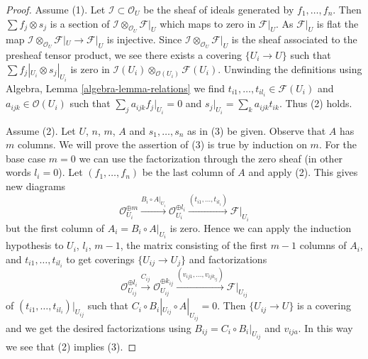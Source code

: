 \begin{proof}
Assume (1). Let $\mathcal{I} \subset \mathcal{O}_U$ be the sheaf of ideals
generated by $f_1, \ldots, f_n$. Then $\sum f_j \otimes s_j$ is
a section of $\mathcal{I} \otimes_{\mathcal{O}_U} \mathcal{F}|_U$
which maps to zero in $\mathcal{F}|_U$. As $\mathcal{F}|_U$ is flat
the map
$\mathcal{I} \otimes_{\mathcal{O}_U} \mathcal{F}|_U \to \mathcal{F}|_U$
is injective. Since $\mathcal{I} \otimes_{\mathcal{O}_U} \mathcal{F}|_U$
is the sheaf associated to the presheaf tensor product, we see
there exists a covering $\{U_i \to U\}$ such
that $\sum f_j|_{U_i} \otimes s_j|_{U_i}$ is zero in
$\mathcal{I}(U_i) \otimes_{\mathcal{O}(U_i)} \mathcal{F}(U_i)$.
Unwinding the definitions using Algebra, Lemma \ref{algebra-lemma-relations}
we find $t_{i1}, \ldots, t_{i l_i} \in \mathcal{F}(U_i)$ and
$a_{ijk} \in \mathcal{O}(U_i)$
such that $\sum_j a_{ijk}f_j|_{U_i} = 0$ and
$s_j|_{U_i} = \sum_k a_{ijk}t_{ik}$.
Thus (2) holds.

\medskip\noindent
Assume (2). Let $U$, $n$, $m$, $A$ and $s_1, \ldots, s_n$ as in (3) be given.
Observe that $A$ has $m$ columns. We will prove the assertion of (3)
is true by induction on $m$. For the base case $m = 0$ we
can use the factorization through the zero sheaf (in other words
$l_i = 0$). Let $(f_1, \ldots, f_n)$ be the last column of $A$
and apply (2). This gives new diagrams
$$
\mathcal{O}_{U_i}^{\oplus m} \xrightarrow{B_i \circ A|_{U_i}}
\mathcal{O}_{U_i}^{\oplus l_i} \xrightarrow{(t_{i1}, \ldots, t_{il_i})}
\mathcal{F}|_{U_i}
$$
but the first column of $A_i = B_i \circ A|_{U_i}$ is zero.
Hence we can apply the induction hypothesis to
$U_i$, $l_i$, $m - 1$, the matrix consisting of
the first $m - 1$ columns of $A_i$, and $t_{i1}, \ldots, t_{il_i}$
to get coverings $\{U_{ij} \to U_j\}$ and factorizations
$$
\mathcal{O}_{U_{ij}}^{\oplus l_i}
\xrightarrow{C_{ij}}
\mathcal{O}_{U_{ij}}^{\oplus k_{ij}}
\xrightarrow{(v_{ij1}, \ldots, v_{ij k_{ij}})}
\mathcal{F}|_{U_{ij}}
$$
of $(t_{i1}, \ldots, t_{il_i})|_{U_{ij}}$ such that
$C_i \circ B_i|_{U_{ij}} \circ A|_{U_{ij}} = 0$.
Then $\{U_{ij} \to U\}$ is a covering and we get the
desired factorizations
using $B_{ij} = C_i \circ B_i|_{U_{ij}}$ and
$v_{ija}$. In this way we see that (2) implies (3).


\end{proof}
